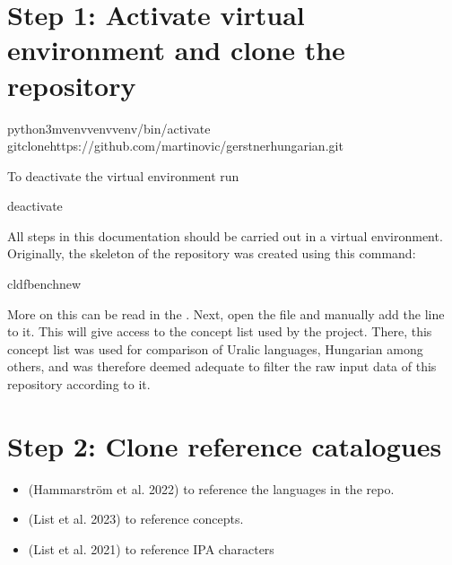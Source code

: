 \documentclass[letterpaper,10pt,english]{sphinxmanual}
\begin{document}
\section{Step 1: Activate virtual environment and clone the repository}
\label{\detokenize{mkcldf:step-1-activate-virtual-environment-and-clone-the-repository}}
\begin{sphinxVerbatim}[commandchars=\\\{\}]
python3\PYGZhy{}mvenvvenvvenv/bin/activate
gitclonehttps://github.com/martino\PYGZhy{}vic/gerstnerhungarian.git
\end{sphinxVerbatim}

\sphinxAtStartPar
To deactivate the virtual environment run

\begin{sphinxVerbatim}[commandchars=\\\{\}]
deactivate
\end{sphinxVerbatim}

\sphinxAtStartPar
All steps in this documentation should be carried out in a virtual
environment. Originally, the skeleton of the repository was created using this
command:

\begin{sphinxVerbatim}[commandchars=\\\{\}]
cldfbenchnew
\end{sphinxVerbatim}

\sphinxAtStartPar
More on this can be read in the
.
Next, open the file  and manually add the line
 to it. This will give access to the
concept list used by the 
project. There, this concept list was used for comparison of Uralic languages,
Hungarian among others, and was therefore deemed adequate
to filter the raw input data of this repository according to it.


\section{Step 2: Clone reference catalogues}
\label{\detokenize{mkcldf:step-2-clone-reference-catalogues}}\begin{itemize}
\item {} 
\sphinxAtStartPar
{} (Hammarström et al. 2022)
to reference the languages in the repo.

\item {} 
\sphinxAtStartPar
{} (List et al. 2023) to
reference concepts.

\item {} 
\sphinxAtStartPar
{} (List et al. 2021) to reference IPA
characters

\end{itemize}
\end{document}
